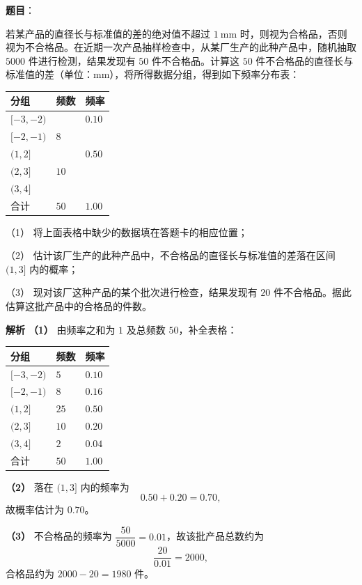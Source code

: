 \begin{answer}

\textbf{题目}：

若某产品的直径长与标准值的差的绝对值不超过 $1\ \mathrm{mm}$ 时，则视为合格品，否则视为不合格品。在近期一次产品抽样检查中，从某厂生产的此种产品中，随机抽取 $5000$ 件进行检测，结果发现有 $50$ 件不合格品。计算这 $50$ 件不合格品的直径长与标准值的差（单位：$\mathrm{mm}$），将所得数据分组，得到如下频率分布表：

\begin{center}
\begin{tabular}{lll}
\toprule
分组 & 频数 & 频率 \\
\midrule
$[-3,-2)$ &  & $0.10$ \\
$[-2,-1)$ & $8$ &  \\
$(1,2]$ &  & $0.50$ \\
$(2,3]$ & $10$ &  \\
$(3,4]$ &  &  \\
合计 & $50$ & $1.00$ \\
\bottomrule
\end{tabular}
\end{center}

（1） 将上面表格中缺少的数据填在答题卡的相应位置；

（2） 估计该厂生产的此种产品中，不合格品的直径长与标准值的差落在区间 $(1,3]$ 内的概率；

（3） 现对该厂这种产品的某个批次进行检查，结果发现有 $20$ 件不合格品。据此估算这批产品中的合格品的件数。

\textbf{解析}
\textbf{（1）} 由频率之和为 $1$ 及总频数 $50$，补全表格：

\begin{center}
\begin{tabular}{lll}
\toprule
分组 & 频数 & 频率 \\
\midrule
$[-3,-2)$ & $5$ & $0.10$ \\
$[-2,-1)$ & $8$ & $0.16$ \\
$(1,2]$ & $25$ & $0.50$ \\
$(2,3]$ & $10$ & $0.20$ \\
$(3,4]$ & $2$ & $0.04$ \\
合计 & $50$ & $1.00$ \\
\bottomrule
\end{tabular}
\end{center}

\textbf{（2）} 落在 $(1,3]$ 内的频率为
\nopagebreak[4]
\[0.50+0.20=0.70,\]
故概率估计为 $0.70$。

\textbf{（3）} 不合格品的频率为 $\dfrac{50}{5000}=0.01$，故该批产品总数约为
\nopagebreak[4]
\[\frac{20}{0.01}=2000,\]
合格品约为 $2000-20=1980$ 件。

\gkanswer{答案（1）：$[-3,-2)$：$5$、$0.10$；$[-2,-1)$：$8$、$0.16$；$(1,2]$：$25$、$0.50$；$(2,3]$：$10$、$0.20$；$(3,4]$：$2$、$0.04$。}



\end{answer}
